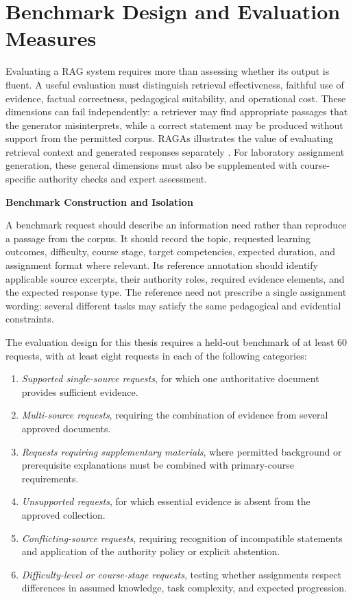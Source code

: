 \documentclass[12pt,a4paper]{report}
\numberwithin{equation}{chapter}
\begin{document}
\section{Benchmark Design and Evaluation Measures}

Evaluating a RAG system requires more than assessing whether its output is fluent. A useful evaluation must distinguish retrieval effectiveness, faithful use of evidence, factual correctness, pedagogical suitability, and operational cost. These dimensions can fail independently: a retriever may find appropriate passages that the generator misinterprets, while a correct statement may be produced without support from the permitted corpus. RAGAs illustrates the value of evaluating retrieval context and generated responses separately \cite{Es2024}. For laboratory assignment generation, these general dimensions must also be supplemented with course-specific authority checks and expert assessment.

\par\medskip
\textbf{Benchmark Construction and Isolation}

A benchmark request should describe an information need rather than reproduce a passage from the corpus. It should record the topic, requested learning outcomes, difficulty, course stage, target competencies, expected duration, and assignment format where relevant. Its reference annotation should identify applicable source excerpts, their authority roles, required evidence elements, and the expected response type. The reference need not prescribe a single assignment wording: several different tasks may satisfy the same pedagogical and evidential constraints.

The evaluation design for this thesis requires a held-out benchmark of at least 60 requests, with at least eight requests in each of the following categories:

\begin{enumerate}
    \item \textit{Supported single-source requests}, for which one authoritative document provides sufficient evidence.
    \item \textit{Multi-source requests}, requiring the combination of evidence from several approved documents.
    \item \textit{Requests requiring supplementary materials}, where permitted background or prerequisite explanations must be combined with primary-course requirements.
    \item \textit{Unsupported requests}, for which essential evidence is absent from the approved collection.
    \item \textit{Conflicting-source requests}, requiring recognition of incompatible statements and application of the authority policy or explicit abstention.
    \item \textit{Difficulty-level or course-stage requests}, testing whether assignments respect differences in assumed knowledge, task complexity, and expected progression.
\end{enumerate}
\end{document}
